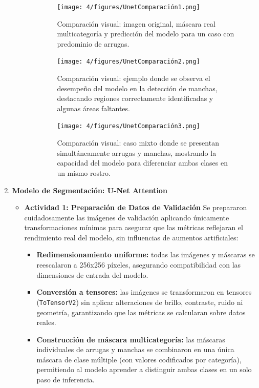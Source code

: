 \begin{enumerate}
\begin{itemize}
\begin{itemize}
  \vspace{0.2cm}
  \begin{figure}[H]
\centering
\texttt{[image: 4/figures/UnetComparación1.png]}
\caption{Comparación visual: imagen original, máscara real multicategoría y predicción del modelo para un caso con predominio de arrugas.}
\label{fig:validacion11}
\end{figure}

\begin{figure}[H]
\centering
\texttt{[image: 4/figures/UnetComparación2.png]}
\caption{Comparación visual: ejemplo donde se observa el desempeño del modelo en la detección de manchas, destacando regiones correctamente identificadas y algunas áreas faltantes.}
\label{fig:validacion22}
\end{figure}

\begin{figure}[H]
\centering
\texttt{[image: 4/figures/UnetComparación3.png]}
\caption{Comparación visual: caso mixto donde se presentan simultáneamente arrugas y manchas, mostrando la capacidad del modelo para diferenciar ambas clases en un mismo rostro.}
\label{fig:validacion33}
\end{figure}
\end{itemize}

  \end{itemize}

  \item \textbf{Modelo de Segmentación: U-Net Attention}
  \begin{itemize}
  \item\textbf{Actividad 1: Preparación de Datos de Validación}
  Se prepararon cuidadosamente las imágenes de validación aplicando únicamente transformaciones mínimas para asegurar que las métricas reflejaran el rendimiento real del modelo, sin influencias de aumentos artificiales:
\begin{itemize}
  \item \textbf{Redimensionamiento uniforme:} todas las imágenes y máscaras se reescalaron a 256x256 píxeles, asegurando compatibilidad con las dimensiones de entrada del modelo.
  \item \textbf{Conversión a tensores:} las imágenes se transformaron en tensores (\texttt{ToTensorV2}) sin aplicar alteraciones de brillo, contraste, ruido ni geometría, garantizando que las métricas se calcularan sobre datos reales.
  \item \textbf{Construcción de máscara multicategoría:} las máscaras individuales de arrugas y manchas se combinaron en una única máscara de clase múltiple (con valores codificados por categoría), permitiendo al modelo aprender a distinguir ambas clases en un solo paso de inferencia.
\end{itemize}


\end{itemize}
\end{enumerate}
